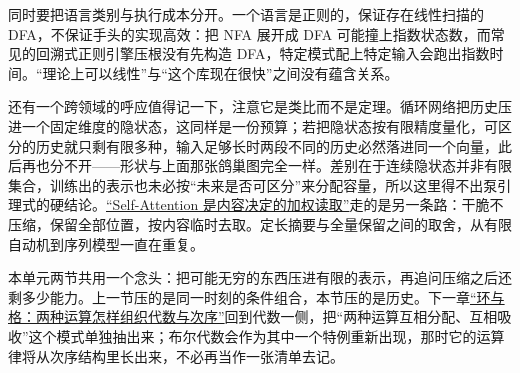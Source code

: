 同时要把语言类别与执行成本分开。一个语言是正则的，保证存在线性扫描的 DFA，不保证手头的实现高效：把 NFA 展开成 DFA 可能撞上指数状态数，而常见的回溯式正则引擎压根没有先构造 DFA，特定模式配上特定输入会跑出指数时间。``理论上可以线性''与``这个库现在很快''之间没有蕴含关系。

还有一个跨领域的呼应值得记一下，注意它是类比而不是定理。循环网络把历史压进一个固定维度的隐状态，这同样是一份预算；若把隐状态按有限精度量化，可区分的历史就只剩有限多种，输入足够长时两段不同的历史必然落进同一个向量，此后再也分不开——形状与上面那张鸽巢图完全一样。差别在于连续隐状态并非有限集合，训练出的表示也未必按``未来是否可区分''来分配容量，所以这里得不出泵引理式的硬结论。\hyperref[sec:14-Deep-Learning/05-Attention-and-Sequence-Models/01]{``Self-Attention 是内容决定的加权读取''}走的是另一条路：干脆不压缩，保留全部位置，按内容临时去取。定长摘要与全量保留之间的取舍，从有限自动机到序列模型一直在重复。

本单元两节共用一个念头：把可能无穷的东西压进有限的表示，再追问压缩之后还剩多少能力。上一节压的是同一时刻的条件组合，本节压的是历史。下一章\hyperref[ch:034]{``环与格：两种运算怎样组织代数与次序''}回到代数一侧，把``两种运算互相分配、互相吸收''这个模式单独抽出来；布尔代数会作为其中一个特例重新出现，那时它的运算律将从次序结构里长出来，不必再当作一张清单去记。
